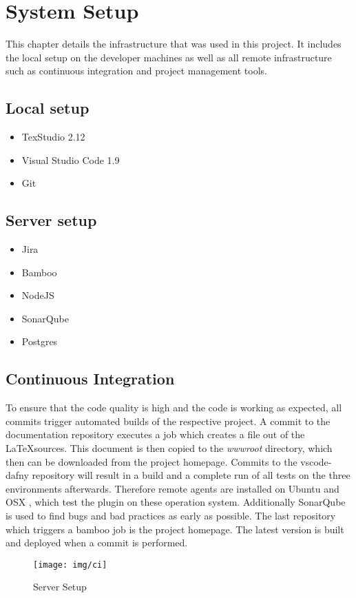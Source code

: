 \section{System Setup}
This chapter details the infrastructure that was used in this project. It includes the local setup on the developer machines as well as all remote infrastructure such as continuous integration and project management tools. 
\subsection{Local setup}
\begin{itemize}
	\item TexStudio 2.12
	\item Visual Studio Code 1.9
	\item Git
\end{itemize}
\subsection{Server setup}
\begin{itemize}
	\item Jira
	\item Bamboo
	\item NodeJS
	\item SonarQube
	\item Postgres
\end{itemize}
\subsection{Continuous Integration}
To ensure that the code quality is high and the code is working as expected, all commits trigger automated builds of the respective project. A commit to the documentation repository executes a job which creates a file out of the \LaTeX sources. This document is then copied to the \emph{wwwroot} directory, which then can be downloaded from the project homepage. Commits to the vscode-dafny repository will result in a build and a complete run of all tests on the three environments afterwards. Therefore remote agents are installed on Ubuntu and OSX , which test the plugin on these operation system.  Additionally SonarQube is used to find bugs and bad practices as early as possible. The last repository which triggers a bamboo job is the project homepage. The latest version is built and deployed when a commit is performed. 
\begin{figure}[H]
	\centering
	\texttt{[image: img/ci]}
	\caption{Server Setup}
	\label{fig:Server setup}
\end{figure}